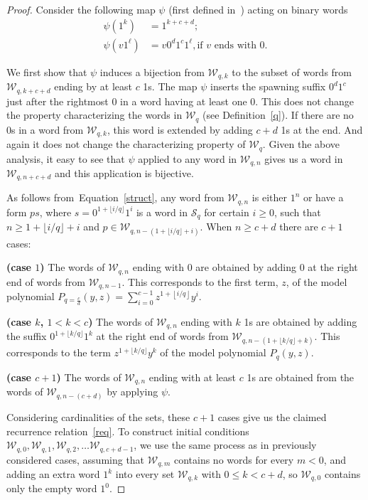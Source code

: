 \documentclass[a4paper,12pt]{article}
\theoremstyle{definition}
\newcommand{\W}{\mathcal{W}}
\def\S{\mathcal{S}}
\let\le\leqslant
\let\ge\geqslant
\begin{document}
\begin{proof}
  Consider the following map $\psi$ (first defined in~\cite{ourfibo})
  acting on binary words
  \begin{align*}
    \psi(1^k) & = 1^{k+c+d};\\
    \psi(v 1^\ell) & = v 0^d1^c 1^\ell, \text{if } v \text{ ends with } 0.
  \end{align*}

  We first show that $\psi$ induces a bijection from $\W_{q,k}$ to the
  subset of words from $\W_{q,k+c+d}$ ending by at least $c$ 1s.  The
  map $\psi$ inserts the spawning suffix $0^d1^c$ just after the
  rightmost 0 in a word having at least one 0. This does not change
  the property characterizing the words in $\W_q$ (see
  Definition~\ref{q}). If there are no 0s in a word from $\W_{q,k}$,
  this word is extended by adding $c+d$ 1s at the end. And again it
  does not change the characterizing property of $\W_q$. Given the
  above analysis, it easy to see that $\psi$ applied to any word in
  $\W_{q,n}$ gives us a word in $\W_{q,n+c+d}$ and this application is
  bijective.

  As follows from~Equation~\eqref{struct}, any word from $\W_{q,n}$ is
  either $1^n$ or have a form $ps$, where $s = 0^{1 + \lfloor i/q
    \rfloor}1^i$ is a word in $\S_q$ for certain $i \ge 0$, such that
  $n \ge 1 + \lfloor i/q \rfloor + i$ and $p \in \W_{q,n-(1 + \lfloor
    i/q \rfloor + i)}$.  When $n\ge c+d$ there are $c+1$ cases:

  {\bf (case $1$)} The words of $\W_{q,n}$ ending with 0 are obtained
  by adding $0$ at the right end of words from $\W_{q,n-1}$. This
  corresponds to the first term, $z$, of the model polynomial
  $P_{q=\frac{c}{d}}(y,z) = \sum_{i=0}^{c-1} z^{1 + \left\lfloor i/q \right\rfloor}
  y^i$.
  
  {\bf (case $k$, $1 < k < c$)} The words of $\W_{q,n}$ ending with
  $k$ 1s are obtained by adding the suffix $0^{1 + \lfloor k/q
    \rfloor}1^k$ at the right end of words from $\W_{q,n-(1 + \lfloor
    k/q \rfloor + k)}$.  This corresponds to the term $z^{1+\lfloor
    k/q \rfloor}y^k$ of the model polynomial $P_q(y,z)$.
  
  {\bf (case $c+1$)} The words of $\W_{q,n}$ ending with at least $c$
  1s are obtained from the words of $\W_{q,n-(c+d)}$ by applying
  $\psi$.
  
  Considering cardinalities of the sets, these $c+1$ cases give us the
  claimed recurrence relation~\eqref{req}. To construct initial
  conditions $\W_{q,0}, \W_{q,1}, \W_{q,2}, \ldots \W_{q,c+d-1}$, we
  use the same process as in previously considered cases, assuming
  that $\W_{q,m}$ contains no words for every $m < 0$, and adding an
  extra word $1^k$ into every set $\W_{q,k}$ with $0 \le k < c+d$, so
  $\W_{q,0}$ contains only the empty word $1^0$.
\end{proof}
\end{document}
